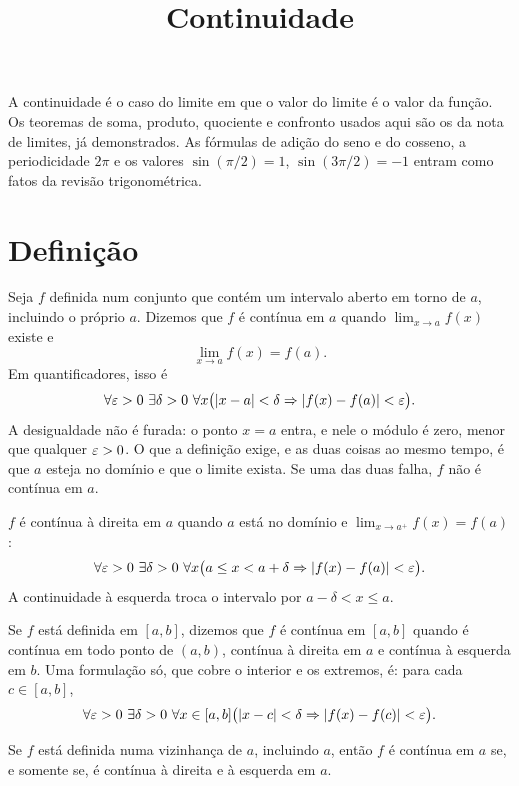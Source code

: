 \documentclass[11pt,a4paper]{article}
\title{Continuidade}
\author{}
\date{}
\begin{document}
\maketitle
\tableofcontents

A continuidade \'e o caso do limite em que o valor do limite \'e o valor da fun\c{c}\~ao. Os teoremas de soma, produto, quociente e confronto usados aqui s\~ao os da nota de limites, j\'a demonstrados. As f\'ormulas de adi\c{c}\~ao do seno e do cosseno, a periodicidade $2\pi$ e os valores $\sin(\pi/2)=1$, $\sin(3\pi/2)=-1$ entram como fatos da revis\~ao trigonom\'etrica.

\section{Defini\c{c}\~ao}
\label{sec:def-cont}

\begin{definicao}
\label{def:cont}
Seja $f$ definida num conjunto que cont\'em um intervalo aberto em torno de $a$, incluindo o pr\'oprio $a$. Dizemos que $f$ \'e cont\'inua em $a$ quando $\lim_{x\to a}f(x)$ existe e
\[
\lim_{x\to a}f(x)=f(a).
\]
Em quantificadores, isso \'e
\[
\forall\varepsilon>0\ \exists\delta>0\ \forall x\bigl(\left\lvert x-a \right\rvert<\delta \Rightarrow \left\lvert f(x)-f(a) \right\rvert<\varepsilon\bigr).
\]
A desigualdade n\~ao \'e furada: o ponto $x=a$ entra, e nele o m\'odulo \'e zero, menor que qualquer $\varepsilon>0$. O que a defini\c{c}\~ao exige, e as duas coisas ao mesmo tempo, \'e que $a$ esteja no dom\'inio e que o limite exista. Se uma das duas falha, $f$ n\~ao \'e cont\'inua em $a$.
\end{definicao}

\begin{definicao}
$f$ \'e cont\'inua \`a direita em $a$ quando $a$ est\'a no dom\'inio e $\lim_{x\to a^+}f(x)=f(a)$:
\[
\forall\eps>0\ \exists\delta>0\ \forall x\bigl(a\le x<a+\delta \Rightarrow \abs{f(x)-f(a)}<\eps\bigr).
\]
A continuidade \`a esquerda troca o intervalo por $a-\delta<x\le a$.

Se $f$ est\'a definida em $[a,b]$, dizemos que $f$ \'e cont\'inua em $[a,b]$ quando \'e cont\'inua em todo ponto de $(a,b)$, cont\'inua \`a direita em $a$ e cont\'inua \`a esquerda em $b$. Uma formula\c{c}\~ao s\'o, que cobre o interior e os extremos, \'e: para cada $c\in[a,b]$,
\[
\forall\eps>0\ \exists\delta>0\ \forall x\in[a,b]\bigl(\abs{x-c}<\delta \Rightarrow \abs{f(x)-f(c)}<\eps\bigr).
\]
\end{definicao}

\begin{teorema}
\label{teo:cont-laterais}
Se $f$ est\'a definida numa vizinhan\c{c}a de $a$, incluindo $a$, ent\~ao $f$ \'e cont\'inua em $a$ se, e somente se, \'e cont\'inua \`a direita e \`a esquerda em $a$.
\end{teorema}
\end{document}
